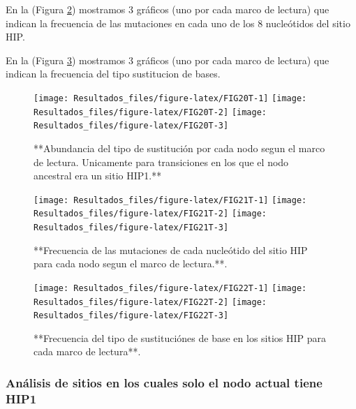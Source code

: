 \documentclass[
]{book}
\begin{document}
En la (Figura \ref{fig:FIG21T}) mostramos 3 gráficos (uno por cada marco de lectura) que indican la frecuencia de las mutaciones en cada uno de los 8 nucleótidos del sitio HIP.

En la (Figura \ref{fig:FIG22T}) mostramos 3 gráficos (uno por cada marco de lectura) que indican la frecuencia del tipo sustitucion de bases.

\begin{figure}

{\centering \texttt{[image: Resultados\_files/figure-latex/FIG20T-1]} \texttt{[image: Resultados\_files/figure-latex/FIG20T-2]} \texttt{[image: Resultados\_files/figure-latex/FIG20T-3]} 

}

\caption{**Abundancia del tipo de sustitución por cada nodo segun el marco de lectura. Unicamente para transiciones en los que el nodo ancestral era un sitio HIP1.**}\label{fig:FIG20T}
\end{figure}

\begin{figure}

{\centering \texttt{[image: Resultados\_files/figure-latex/FIG21T-1]} \texttt{[image: Resultados\_files/figure-latex/FIG21T-2]} \texttt{[image: Resultados\_files/figure-latex/FIG21T-3]} 

}

\caption{**Frecuencia de las mutaciones de cada nucleótido del sitio HIP para cada nodo segun el marco de lectura.**.}\label{fig:FIG21T}
\end{figure}

\begin{figure}

{\centering \texttt{[image: Resultados\_files/figure-latex/FIG22T-1]} \texttt{[image: Resultados\_files/figure-latex/FIG22T-2]} \texttt{[image: Resultados\_files/figure-latex/FIG22T-3]} 

}

\caption{**Frecuencia del tipo de sustituciónes de base en los sitios HIP para cada marco de lectura**.}\label{fig:FIG22T}
\end{figure}

\hypertarget{anuxe1lisis-de-sitios-en-los-cuales-solo-el-nodo-actual-tiene-hip1-4}{%
\subsubsection{Análisis de sitios en los cuales solo el nodo actual tiene HIP1}\label{anuxe1lisis-de-sitios-en-los-cuales-solo-el-nodo-actual-tiene-hip1-4}}
\end{document}
